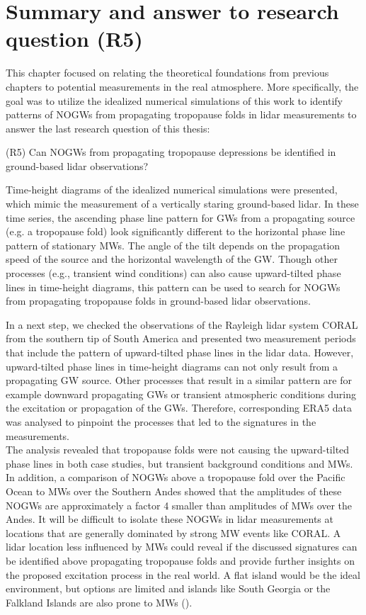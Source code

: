 \section{Summary and answer to research question (R5)}
\label{sec:lidOb-summary}
This chapter focused on relating the theoretical foundations from previous chapters to potential measurements in the real atmosphere. More specifically, the goal was to utilize the idealized numerical simulations of this work to identify patterns of NOGWs from propagating tropopause folds in lidar measurements to answer the last research question of this thesis:
%
\begin{tcolorbox}[]
    (R5) Can NOGWs from propagating tropopause depressions be identified in ground-based lidar observations?
\end{tcolorbox}
%
Time-height diagrams of the idealized numerical simulations were presented, which mimic the measurement of a vertically staring ground-based lidar. In these time series, the ascending phase line pattern for GWs from a propagating source (e.g. a tropopause fold) look significantly different to the horizontal phase line pattern of stationary MWs. The angle of the tilt depends on the propagation speed of the source and the horizontal wavelength of the GW. Though other processes (e.g., transient wind conditions) can also cause upward-tilted phase lines in time-height diagrams, this pattern can be used to search for NOGWs from propagating tropopause folds in ground-based lidar observations. 

In a next step, we checked the observations of the Rayleigh lidar system CORAL from the southern tip of South America and presented two measurement periods that include the pattern of upward-tilted phase lines in the lidar data. However, upward-tilted phase lines in time-height diagrams can not only result from a propagating GW source. Other processes that result in a similar pattern are for example downward propagating GWs or transient atmospheric conditions during the excitation or propagation of the GWs. Therefore, corresponding ERA5 data was analysed to pinpoint the processes that led to the signatures in the measurements. \\
The analysis revealed that tropopause folds were not causing the upward-tilted phase lines in both case studies, but transient background conditions and MWs. In addition, a comparison of NOGWs above a tropopause fold over the Pacific Ocean to MWs over the Southern Andes showed that the amplitudes of these NOGWs are approximately a factor 4 smaller than amplitudes of MWs over the Andes. It will be difficult to isolate these NOGWs in lidar measurements at locations that are generally dominated by strong MW events like CORAL. A lidar location less influenced by MWs could reveal if the discussed signatures can be identified above propagating tropopause folds and provide further insights on the proposed excitation process in the real world. A flat island would be the ideal environment, but options are limited and islands like South Georgia or the Falkland Islands are also prone to MWs (\cite{hindley_stratospheric_2021}).   


